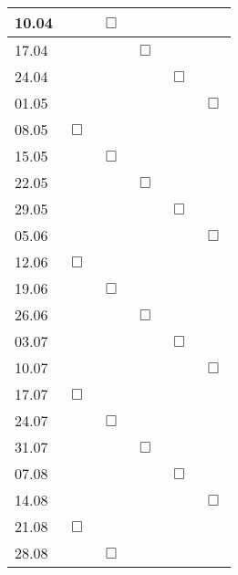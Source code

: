 \documentclass{article}
\begin{document}
\begin{table}[!ht]
\begin{tabular}{l|l|l|l|l|l}
      \\\midrule
      10.04 &             & { \large $ \Box $ } &             &             &            
      \\\midrule
      17.04 &             &             & { \large $ \Box $ } &             &            
      \\\midrule
      24.04 &             &             &             & { \large $ \Box $ } &            
      \\\midrule
      01.05 &             &             &             &             & { \large $ \Box $ }
      \\\midrule
      08.05 & { \large $ \Box $ } &             &             &             &            
      \\\midrule
      15.05 &             & { \large $ \Box $ } &             &             &            
      \\\midrule
      22.05 &             &             & { \large $ \Box $ } &             &            
      \\\midrule
      29.05 &             &             &             & { \large $ \Box $ } &            
      \\\midrule
      05.06 &             &             &             &             & { \large $ \Box $ }
      \\\midrule
      12.06 & { \large $ \Box $ } &             &             &             &            
      \\\midrule
      19.06 &             & { \large $ \Box $ } &             &             &            
      \\\midrule
      26.06 &             &             & { \large $ \Box $ } &             &            
      \\\midrule
      03.07 &             &             &             & { \large $ \Box $ } &            
      \\\midrule
      10.07 &             &             &             &             & { \large $ \Box $ }
      \\\midrule
      17.07 & { \large $ \Box $ } &             &             &             &            
      \\\midrule
      24.07 &             & { \large $ \Box $ } &             &             &            
      \\\midrule
      31.07 &             &             & { \large $ \Box $ } &             &            
      \\\midrule
      07.08 &             &             &             & { \large $ \Box $ } &            
      \\\midrule
      14.08 &             &             &             &             & { \large $ \Box $ }
      \\\midrule
      21.08 & { \large $ \Box $ } &             &             &             &            
      \\\midrule
      28.08 &             & { \large $ \Box $ } &             &             &            
      \\\bottomrule
    \end{tabular}
  \end{table}
\end{document}
